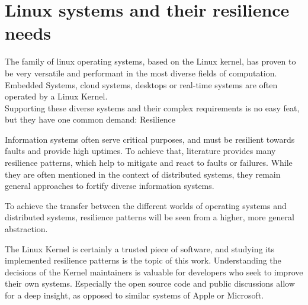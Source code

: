 \chapter{Linux systems and their resilience needs}
The family of linux operating systems, based on the Linux kernel, has proven to be very versatile and performant in the most diverse fields of computation. Embedded Systems, cloud systems, desktops or real-time systems are often operated by a Linux Kernel.\\
Supporting these diverse systems and their complex requirements is no easy feat, but they have one common demand: Resilience

Information systems often serve critical purposes, and must be resilient towards faults and provide high uptimes. To achieve that, literature provides many resilience patterns, which help to mitigate and react to faults or failures. 
While they are often mentioned in the context of distributed systems, they remain general approaches to fortify diverse information systems.

To achieve the transfer between the different worlds of operating systems and distributed systems, resilience patterns will be seen from a higher, more general abstraction.

The Linux Kernel is certainly a trusted piece of software, and studying its implemented resilience patterns is the topic of this work. Understanding the decisions of the Kernel maintainers is valuable for developers who seek to improve their own systems. Especially the open source code and public discussions allow for a deep insight, as opposed to similar systems of Apple or Microsoft.


